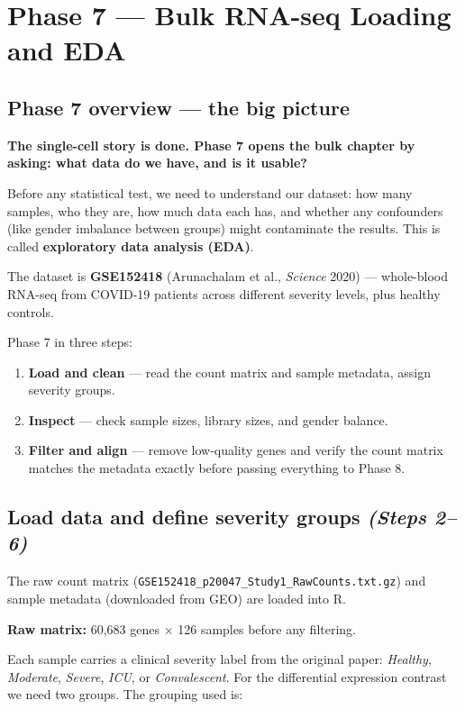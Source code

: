 \documentclass[11pt, a4paper]{article}
\begin{document}
\section{Phase 7 — Bulk RNA-seq Loading and EDA}

\subsection{Phase 7 overview — the big picture}

\textbf{The single-cell story is done. Phase 7 opens the bulk chapter by asking: what data do we have, and is it usable?}

Before any statistical test, we need to understand our dataset:
how many samples, who they are, how much data each has, and
whether any confounders (like gender imbalance between groups) might
contaminate the results. This is called \textbf{exploratory data analysis (EDA)}.

The dataset is \textbf{GSE152418} (Arunachalam et al., \textit{Science} 2020) —
whole-blood RNA-seq from COVID-19 patients across different severity levels, plus healthy controls.

Phase 7 in three steps:
\begin{enumerate}[nosep]
  \item \textbf{Load and clean} — read the count matrix and sample metadata, assign severity groups.
  \item \textbf{Inspect} — check sample sizes, library sizes, and gender balance.
  \item \textbf{Filter and align} — remove low-quality genes and verify the count matrix
        matches the metadata exactly before passing everything to Phase 8.
\end{enumerate}

\subsection{Load data and define severity groups \small\normalfont\textit{(Steps 2–6)}}

The raw count matrix (\texttt{GSE152418\_p20047\_Study1\_RawCounts.txt.gz}) and
sample metadata (downloaded from GEO) are loaded into R.

\textbf{Raw matrix:} 60,683 genes $\times$ 126 samples before any filtering.

Each sample carries a clinical severity label from the original paper:
\textit{Healthy}, \textit{Moderate}, \textit{Severe}, \textit{ICU}, or \textit{Convalescent}.
For the differential expression contrast we need two groups. The grouping used is:
\end{document}
